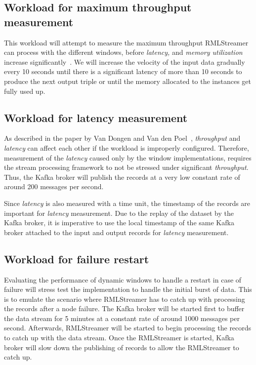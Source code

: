 \subsection{Workload for maximum throughput measurement}
This workload will attempt to measure the maximum throughput RMLStreamer can 
process with the different windows, before \emph{latency,} and \emph{memory utilization}
increase significantly~\cite{benchmark_dsdps}. We will increase the velocity of the input data gradually 
every 10 seconds until there is a significant latency of more than 10 seconds to produce
the next output triple or until the memory allocated to the instances get fully used up. 


\subsection{Workload for latency measurement}
As described in the paper by Van Dongen and Van den Poel~\cite{evalution_of_spe}, 
\emph{throughput} and \emph{latency} can affect each other if the workload is 
improperly configured. Therefore, measurement of the \emph{latency} caused only 
by the window implementations, requires the stream processing framework to not be 
stressed under significant \emph{throughput}. Thus, the Kafka broker will 
publish the records at a very low constant rate of around 200 messages per second. 

Since \emph{latency} is also measured with a time unit, the timestamp of the 
records are important for \emph{latency} measurement. Due to the replay of the dataset 
by the Kafka broker, it is imperative to use the local timestamp of the same Kafka broker
attached to the input and output records for \emph{latency} 
measurement\cite{latency_measurement_kafka}.

\subsection{Workload for failure restart}
Evaluating the performance of dynamic windows to handle a restart in case of failure  
will stress test the implementation to handle the initial burst of data.
This is to emulate the scenario where RMLStreamer has to catch up with processing 
the records after a node failure. The Kafka 
broker will be started first to buffer the data stream for 5 minutes at a constant rate 
of around 1000 messages per second. Afterwards, RMLStreamer will be started to begin 
processing the records to catch up with the data stream. Once the RMLStreamer is started, 
Kafka broker will slow down the publishing of records to allow the RMLStreamer to catch
up.

